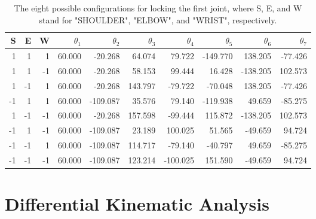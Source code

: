 \documentclass{article}
\begin{document}
\begin{table}[h]
\centering
\begin{tabular}{*{10}{r}}
\toprule
S & E & W & $\theta_1$ & $\theta_2$ & $\theta_3$ & $\theta_4$ & $\theta_5$ & $\theta_6$ & $\theta_7$ \\
\midrule
 1 &  1 &  1 & 60.000 &  -20.268   &  64.074 &   79.722 & -149.770 &  138.205 & -77.426 \\
 1 &  1 & -1 & 60.000 &  -20.268   &  58.153 &   99.444 &   16.428 & -138.205 & 102.573 \\
 1 & -1 &  1 & 60.000 &  -20.268   & 143.797 &  -79.722 &  -70.048 &  138.205 & -77.426 \\
-1 &  1 &  1 & 60.000 & -109.087   &  35.576 &   79.140 & -119.938 &   49.659 & -85.275 \\
 1 & -1 & -1 & 60.000 &  -20.268   & 157.598 &  -99.444 &  115.872 & -138.205 & 102.573 \\
-1 &  1 & -1 & 60.000 & -109.087   &  23.189 &  100.025 &   51.565 &  -49.659 &  94.724 \\
-1 & -1 &  1 & 60.000 & -109.087   & 114.717 &  -79.140 &  -40.797 &   49.659 & -85.275 \\
-1 & -1 & -1 & 60.000 & -109.087   & 123.214 & -100.025 &  151.590 &  -49.659 &  94.724 \\
\bottomrule
\end{tabular}
\caption{The eight possible configurations for locking the first joint, where S, E, and W stand for "SHOULDER", "ELBOW", and "WRIST", respectively.}
\label{ik_res}
\end{table}

\section{Differential Kinematic Analysis}
\end{document}
